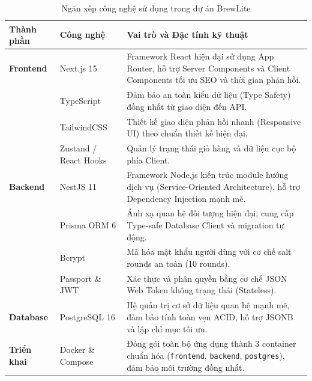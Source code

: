 \documentclass[12pt,a4paper,oneside]{report}
\begin{document}
\begin{table}[H]
\centering
\caption{Ngăn xếp công nghệ sử dụng trong dự án BrewLite}
\label{tab:tech-stack}
\begin{tabularx}{\textwidth}{llX}
\toprule
\textbf{Thành phần} & \textbf{Công nghệ} & \textbf{Vai trò và Đặc tính kỹ thuật} \\
\midrule
\textbf{Frontend} & Next.js 15 & Framework React hiện đại sử dụng App Router, hỗ trợ Server Components và Client Components tối ưu SEO và thời gian phản hồi. \\
& TypeScript & Đảm bảo an toàn kiểu dữ liệu (Type Safety) đồng nhất từ giao diện đến API. \\
& TailwindCSS & Thiết kế giao diện phản hồi nhanh (Responsive UI) theo chuẩn thiết kế hiện đại. \\
& Zustand / React Hooks & Quản lý trạng thái giỏ hàng và dữ liệu cục bộ phía Client. \\
\midrule
\textbf{Backend} & NestJS 11 & Framework Node.js kiến trúc module hướng dịch vụ (Service-Oriented Architecture), hỗ trợ Dependency Injection mạnh mẽ. \\
& Prisma ORM 6 & Ánh xạ quan hệ đối tượng hiện đại, cung cấp Type-safe Database Client và migration tự động. \\
& Bcrypt & Mã hóa mật khẩu người dùng với cơ chế salt rounds an toàn (10 rounds). \\
& Passport \& JWT & Xác thực và phân quyền bằng cơ chế JSON Web Token không trạng thái (Stateless). \\
\midrule
\textbf{Database} & PostgreSQL 16 & Hệ quản trị cơ sở dữ liệu quan hệ mạnh mẽ, đảm bảo tính toàn vẹn ACID, hỗ trợ JSONB và lập chỉ mục tối ưu. \\
\midrule
\textbf{Triển khai} & Docker \& Compose & Đóng gói toàn bộ ứng dụng thành 3 container chuẩn hóa (\texttt{frontend}, \texttt{backend}, \texttt{postgres}), đảm bảo môi trường đồng nhất. \\
\bottomrule
\end{tabularx}
\end{table}
\end{document}
